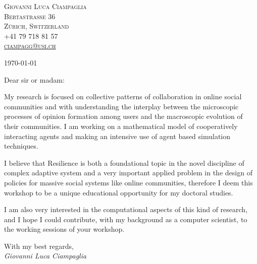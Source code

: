 \documentclass[11pt, a4paper]{article}
\begin{document}
\center
\textsc{Giovanni Luca Ciampaglia\\
Bertastraße 36\\
 Zürich, Switzerland\\
+41 79 718 81 57\\
\href{mailto:ciampagg@usi.ch}{ciampagg@usi.ch}
}

\raggedright
\vfill

\today
\vspace{2em}

Dear sir or madam:

My research is focused on collective patterns of collaboration in online social
communities and with understanding the interplay between the microscopic
processes of opinion formation among users and the macroscopic evolution of
their communities. I am working on a mathematical model of cooperatively
interacting agents and making an intensive use of agent based simulation
techniques. 

I believe that Resilience is both a foundational topic in the novel discipline
of complex adaptive system and a very important applied problem in the design of
policies for massive social systems like online communities, therefore I deem
this workshop to be a unique educational opportunity for my doctoral studies. 

I am also very interested in the computational aspects of this kind of research,
and I hope I could contribute, with my background as a computer scientist, to
the working sessions of your workshop.

\vspace{1in}
\raggedleft
With my best regards,\\
\emph{Giovanni Luca Ciampaglia}

\vspace{1in}
\end{document}
